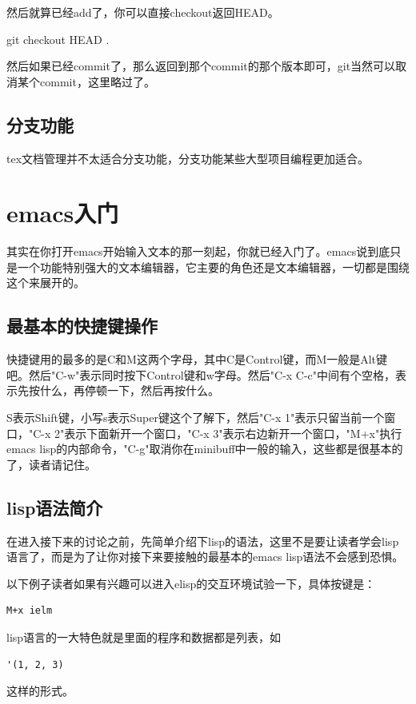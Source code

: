 \documentclass[11pt,oneside]{book}
\begin{document}
然后就算已经add了，你可以直接checkout返回HEAD。
\begin{tcbbash}[]
git  checkout  HEAD  .
\end{tcbbash}

然后如果已经commit了，那么返回到那个commit的那个版本即可，git当然可以取消某个commit，这里略过了。


\section{分支功能}
tex文档管理并不太适合分支功能，分支功能某些大型项目编程更加适合。





\chapter{emacs入门}
\label{sec:emacs}
其实在你打开emacs开始输入文本的那一刻起，你就已经入门了。emacs说到底只是一个功能特别强大的文本编辑器，它主要的角色还是文本编辑器，一切都是围绕这个来展开的。

\section{最基本的快捷键操作}
快捷键用的最多的是C和M这两个字母，其中C是Control键，而M一般是Alt键吧。然后"C-w"表示同时按下Control键和w字母。然后"C-x C-c"中间有个空格，表示先按什么，再停顿一下，然后再按什么。

S表示Shift键，小写s表示Super键这个了解下，然后"C-x 1"表示只留当前一个窗口，"C-x 2"表示下面新开一个窗口，"C-x 3"表示右边新开一个窗口，"M+x"执行emacs lisp的内部命令，"C-g"取消你在minibuff中一般的输入，这些都是很基本的了，读者请记住。


\section{lisp语法简介}
在进入接下来的讨论之前，先简单介绍下lisp的语法，这里不是要让读者学会lisp语言了，而是为了让你对接下来要接触的最基本的emacs lisp语法不会感到恐惧。

以下例子读者如果有兴趣可以进入elisp的交互环境试验一下，具体按键是：
\begin{Verbatim}
M+x ielm
\end{Verbatim}

lisp语言的一大特色就是里面的程序和数据都是列表，如
\begin{Verbatim}
'(1, 2, 3)
\end{Verbatim}
这样的形式。
\end{document}
